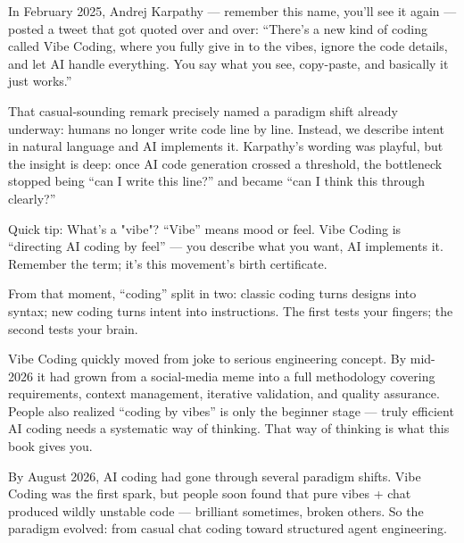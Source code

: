 


In February 2025, Andrej Karpathy — remember this name, you'll see it again — posted a tweet that got quoted over and over: “There's a new kind of coding called Vibe Coding, where you fully give in to the vibes, ignore the code details, and let AI handle everything. You say what you see, copy-paste, and basically it just works.”

That casual-sounding remark precisely named a paradigm shift already underway: humans no longer write code line by line. Instead, we describe intent in natural language and AI implements it. Karpathy's wording was playful, but the insight is deep: once AI code generation crossed a threshold, the bottleneck stopped being “can I write this line?” and became “can I think this through clearly?”

\begin{tcbinfo}{Quick tip: What's a "vibe"?}
“Vibe” means mood or feel. Vibe Coding is “directing AI coding by feel” — you describe what you want, AI implements it. Remember the term; it's this movement's birth certificate.

\end{tcbinfo}

From that moment, “coding” split in two: classic coding turns designs into syntax; new coding turns intent into instructions. The first tests your fingers; the second tests your brain.

Vibe Coding quickly moved from joke to serious engineering concept. By mid-2026 it had grown from a social-media meme into a full methodology covering requirements, context management, iterative validation, and quality assurance. People also realized “coding by vibes” is only the beginner stage — truly efficient AI coding needs a systematic way of thinking. That way of thinking is what this book gives you.


By August 2026, AI coding had gone through several paradigm shifts. Vibe Coding was the first spark, but people soon found that pure vibes + chat produced wildly unstable code — brilliant sometimes, broken others. So the paradigm evolved: from casual chat coding toward structured agent engineering.


